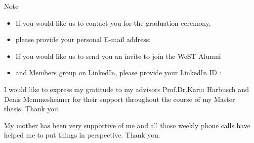 \documentclass[a4paper, 11pt]{article}
\begin{document}

\vspace{2em}
        \begin{flushleft}
        	\begin{Large}
                	Note
              \\[5mm]
        	\end{Large}
            \begin{itemize}
            	\item If you would like us to contact you for the graduation ceremony, 
                \item[] please provide your personal E-mail address: \dotfill
                \item If you would like us to send you an invite to join the WeST Alumni 
                \item[] and Members group on LinkedIn, please provide your LinkedIn ID : \dotfill
            \end{itemize}
            \cleardoublepage%
        \end{flushleft}
\pagebreak      



\vspace*{\fill}
I would like to express my gratitude to my advisors Prof.Dr.Karin Harbusch and Denis Memmesheimer for their support throughout the course of my Master thesis. Thank you.

My mother has been very supportive of me and all those weekly phone calls have helped me to put things in perspective. Thank you.
\vspace*{\fill}


  \cleardoublepage%
\pagebreak        

\end{document}
